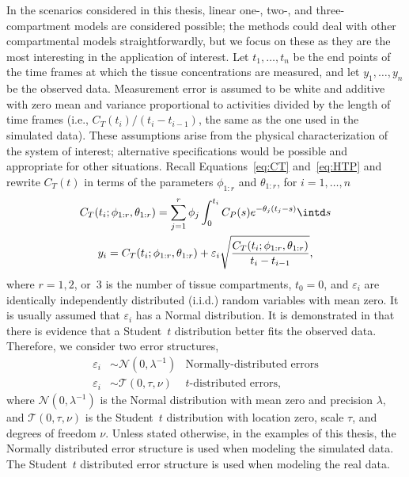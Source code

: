 In the scenarios considered in this thesis, linear one-, two-, and three-compartment models are considered possible; the methods could deal with other compartmental models straightforwardly, but we focus on these as they are the most interesting in the application of interest. Let $t_1, \dots, t_n$ be the end points of the time frames at which the tissue concentrations are measured, and let $y_1,\dots,y_n$ be the observed data. Measurement error is assumed to be white and additive with zero mean and variance proportional to activities divided by the length of time frames (i.e., $C_T(t_i)/(t_i - t_{i-1})$, the same as the one used in the simulated data). These assumptions arise from the physical characterization of the \pet system of interest; alternative specifications would be possible and appropriate for other situations. Recall Equations~\eqref{eq:CT} and~\eqref{eq:HTP} and rewrite $C_T(t)$ in terms of the parameters $\phi_{1:r}$ and $\theta_{1:r}$, for $i = 1,\dots,n$
\begin{gather*}
  C_T(t_i;\phi_{1:r},\theta_{1:r}) =
  \sum_{j=1}^r \phi_j\int_0^{t_i}C_P(s)e^{-\theta_j(t_j-s)} \intd s \\
  y_i = C_T(t_i;\phi_{1:r},\theta_{1:r}) +
  \varepsilon_i\sqrt{\frac{C_T(t_i;\phi_{1:r},\theta_{1:r})} {t_i - t_{i-1}}},
\end{gather*}
where $r = 1, 2$, or~$3$ is the number of tissue compartments, $t_0 = 0$, and $\varepsilon_i$ are identically independently distributed (i.i.d.) random variables with mean zero. It is usually assumed that $\varepsilon_i$ has a Normal distribution. It is demonstrated in \cite{Zhou2013} that there is evidence that a Student~$t$ distribution better fits the observed data. Therefore, we consider two error structures,
\begin{align*}
  \varepsilon_i &\sim \mathcal{N}(0,\lambda^{-1})
  &\text{Normally-distributed errors} \\
  \varepsilon_i &\sim \mathcal{T}(0,\tau,\nu)
  &\text{$t$-distributed errors},
\end{align*}
where $\mathcal{N}(0,\lambda^{-1})$ is the Normal distribution with mean zero and precision $\lambda$, and $\mathcal{T}(0,\tau,\nu)$ is the Student~$t$ distribution with location zero, scale $\tau$, and degrees of freedom $\nu$. Unless stated otherwise, in the examples of this thesis, the Normally distributed error structure is used when modeling the simulated data. The Student~$t$ distributed error structure is used when modeling the real data.
